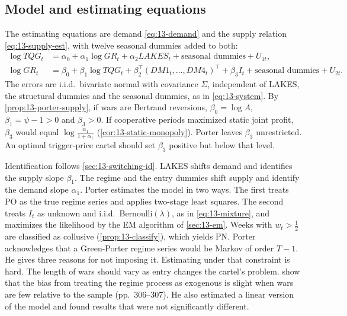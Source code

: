 \subsection{Model and estimating equations}\label{sec:13-jec-model}

The estimating equations are demand \eqref{eq:13-demand} and the supply relation \eqref{eq:13-supply-est}, with
twelve seasonal dummies added to both:
\begin{align}
  \log TQG_t &= \alpha_0 + \alpha_1 \log GR_t + \alpha_2 LAKES_t + \text{seasonal dummies} + U_{1t},
  \label{eq:13-porter-demand}\\
  \log GR_t &= \beta_0 + \beta_1 \log TQG_t + \beta_2^\top (DM1_t, \dots, DM4_t)^\top + \beta_3 I_t
  + \text{seasonal dummies} + U_{2t}. \label{eq:13-porter-supply}
\end{align}
The errors are i.i.d.\ bivariate normal with covariance $\Sigma$, independent of LAKES, the structural
dummies and the seasonal dummies, as in \eqref{eq:13-system}. By \cref{prop:13-porter-supply}, if wars are
Bertrand reversions, $\beta_0 = \log A$, $\beta_1 = \psi - 1 > 0$ and $\beta_3 > 0$. If cooperative periods
maximized static joint profit, $\beta_3$ would equal $\log\frac{\alpha_1}{1+\alpha_1}$ (\cref{cor:13-static-monopoly}).
Porter leaves $\beta_3$ unrestricted. An optimal trigger-price cartel should set $\beta_3$ positive but below that
level.

Identification follows \cref{sec:13-switching-id}. LAKES shifts demand and identifies the supply slope $\beta_1$.
The regime and the entry dummies shift supply and identify the demand slope $\alpha_1$. Porter estimates the model in
two ways. The first treats PO as the true regime series and applies two-stage least squares. The second treats
$I_t$ as unknown and i.i.d.\ Bernoulli$(\lambda)$, as in \eqref{eq:13-mixture}, and maximizes the likelihood by the
EM algorithm of \cref{sec:13-em}. Weeks with $w_t > \frac{1}{2}$ are classified as collusive (\cref{prop:13-classify}),
which yields PN. Porter acknowledges that a Green-Porter regime series would be Markov of order $T-1$. He gives three
reasons for not imposing it. Estimating under that constraint is hard. The length of wars should vary as entry
changes the cartel's problem.  show that the bias from treating the regime process as
exogenous is slight when wars are few relative to the sample (pp.~306--307). He also estimated a linear version of the model and found
results that were not significantly different.

